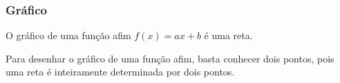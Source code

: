 \subsubsection{Gráfico}

\begin{proposition}
    O gráfico de uma função afim $f(x) = ax + b$ é uma reta.
\end{proposition}

\begin{remark}
Para desenhar o gráfico de uma função afim, basta conhecer dois pontos, pois uma reta é inteiramente determinada por dois pontos.
\end{remark}